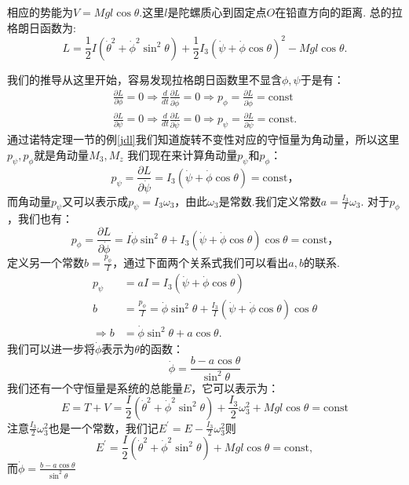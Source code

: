 \documentclass[UTF8,10.5pt,a4paper]{ctexart}
\numberwithin{equation}{section}
\theoremstyle{definition}
\theoremstyle{definition}
\begin{document}
 相应的势能为$V = Mgl\cos \theta$.这里$l$是陀螺质心到固定点$O$在铅直方向的距离.
 总的拉格朗日函数为:
 $$L = \frac{1}{2}I(\dot{\theta}^{2} + \dot{\phi}^{2}\sin^{2}\theta) + \frac{1}{2}I_{3}\left( \dot{\psi} + \dot{\phi}\cos\theta\right)^2-Mgl\cos\theta .$$
\par 我们的推导从这里开始，容易发现拉格朗日函数里不显含$\phi,\psi$于是有：
 \begin{align*}
 \frac{\partial L}{\partial \phi} = 0 \Rightarrow
 \frac{d}{dt}\frac{\partial L}{\partial \dot{\phi}} = 0 \Rightarrow
 p_{\phi} = \frac{\partial L}{\partial \dot{\phi}} = \text{const}\\
  \frac{\partial L}{\partial \psi} = 0 \Rightarrow
 \frac{d}{dt}\frac{\partial L}{\partial \dot{\psi}} = 0 \Rightarrow
 p_{\psi} = \frac{\partial L}{\partial \dot{\psi}} = \text{const}.
 \end{align*}
 通过诺特定理一节的例\ref{jdl}我们知道旋转不变性对应的守恒量为角动量，所以这里$p_{\psi},p_{\phi}$就是角动量$M_3,M_z$
 我们现在来计算角动量$p_{\psi}$和$p_{\phi}$：
$$p_{\psi} = \frac{\partial L}{\partial \dot{\psi}} = I_{3}\left(\dot{\psi} + \dot{\phi}\cos \theta \right) = \text{const} \text{，}$$
而角动量$p_{\psi}$又可以表示成$p_{\psi}=I_3\omega_3$，由此$\omega_3$是常数.我们定义常数$a = \frac{I_{3}}{I}\omega_{3}$.
对于$p_{\phi}$，我们也有：
$$p_{\phi} = \frac{\partial L}{\partial \dot{\phi}} =I\dot{\phi}\sin^{2}\theta + I_{3}\left( \dot{\psi}+\dot{\phi}\cos\theta\right)\cos\theta =\text{const} \text{，}$$
定义另一个常数$b = \frac{p_{\phi}}{I}$，通过下面两个关系式我们可以看出$a,b$的联系.
\begin{align*}
p_{\psi} &= aI = I_{3}\left( \dot{\psi} + \dot{\phi}\cos\theta
\right)\\
    b &= \frac{p_{\phi}}{I} = \dot{\phi}\sin^{2}\theta +
\frac{I_{3}}{I}\left( \dot{\psi} + \dot{\phi}\cos\theta
\right)\cos\theta\\
\Rightarrow b&= \dot{\phi}\sin^{2}\theta + a\cos \theta .
\end{align*}
我们可以进一步将$\dot{\phi}$表示为$\theta$的函数：
$$\dot{\phi}=\frac{b - a\cos \theta}{\sin^{2}\theta}$$
我们还有一个守恒量是系统的总能量$E$，它可以表示为：
$$E = T+ V = \frac{I}{2}\left( \dot{\theta}^{2} +\dot{\phi}^{2}\sin^{2}\theta \right) + \frac{I_{3}}{2}\omega_{3}^{2}+ Mgl\cos\theta = \text{const} $$
注意$\frac{I_{3}}{2}\omega_{3}^{2}$也是一个常数，我们记$E^{\prime}=E-\frac{I_{3}}{2}\omega_{3}^{2}$则
$$E^{\prime}=\frac{I}{2}\left( \dot{\theta}^{2} +\dot{\phi}^{2}\sin^{2}\theta \right)+ Mgl\cos\theta = \text{const} ,$$
而$\dot{\phi}=\frac{b - a\cos \theta}{\sin^{2}\theta}$
\end{document}
